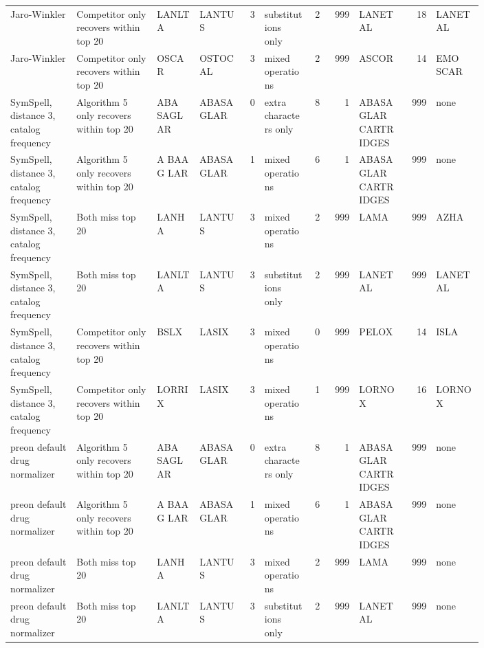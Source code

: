 \begin{landscape}
\begin{tiny}
\begin{longtable}{@{}L{0.14\linewidth}L{0.17\linewidth}L{0.09\linewidth}L{0.10\linewidth}rL{0.10\linewidth}rrL{0.10\linewidth}rL{0.10\linewidth}@{}}
Jaro-Winkler & Competitor only recovers within top 20 & LANLTA & LANTUS & 3 & substitutions only & 2 & 999 & LANETAL & 18 & LANETAL \\
Jaro-Winkler & Competitor only recovers within top 20 & OSCAR & OSTOCAL & 3 & mixed operations & 2 & 999 & ASCOR & 14 & EMO SCAR \\
SymSpell, distance 3, catalog frequency & Algorithm 5 only recovers within top 20 & ABA SAGLAR & ABASAGLAR & 0 & extra characters only & 8 & 1 & ABASAGLAR CARTRIDGES & 999 & none \\
SymSpell, distance 3, catalog frequency & Algorithm 5 only recovers within top 20 & A BAA G LAR & ABASAGLAR & 1 & mixed operations & 6 & 1 & ABASAGLAR CARTRIDGES & 999 & none \\
SymSpell, distance 3, catalog frequency & Both miss top 20 & LANHA & LANTUS & 3 & mixed operations & 2 & 999 & LAMA & 999 & AZHA \\
SymSpell, distance 3, catalog frequency & Both miss top 20 & LANLTA & LANTUS & 3 & substitutions only & 2 & 999 & LANETAL & 999 & LANETAL \\
SymSpell, distance 3, catalog frequency & Competitor only recovers within top 20 & BSLX & LASIX & 3 & mixed operations & 0 & 999 & PELOX & 14 & ISLA \\
SymSpell, distance 3, catalog frequency & Competitor only recovers within top 20 & LORRIX & LASIX & 3 & mixed operations & 1 & 999 & LORNOX & 16 & LORNOX \\
preon default drug normalizer & Algorithm 5 only recovers within top 20 & ABA SAGLAR & ABASAGLAR & 0 & extra characters only & 8 & 1 & ABASAGLAR CARTRIDGES & 999 & none \\
preon default drug normalizer & Algorithm 5 only recovers within top 20 & A BAA G LAR & ABASAGLAR & 1 & mixed operations & 6 & 1 & ABASAGLAR CARTRIDGES & 999 & none \\
preon default drug normalizer & Both miss top 20 & LANHA & LANTUS & 3 & mixed operations & 2 & 999 & LAMA & 999 & none \\
preon default drug normalizer & Both miss top 20 & LANLTA & LANTUS & 3 & substitutions only & 2 & 999 & LANETAL & 999 & none \\
\bottomrule
\end{longtable}
\end{tiny}

\end{landscape}

